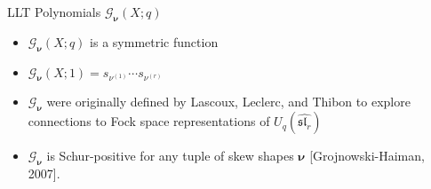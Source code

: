 \documentclass[dvipsnames]{beamer}
\newcommand{\Gcal}{{\mathcal G}}
\newcommand{\nubold}{{\boldsymbol \nu }}
\renewcommand{\sl}{\mathfrak{sl}}
\theoremstyle{definition}
\newcounter{c}
\begin{document}
\begin{frame}{LLT Polynomials \(\Gcal_\nubold(X;q)\)}
  \begin{itemize}
  \item \(\Gcal_\nubold(X;q)\) is a symmetric function\pause
  \item \(\Gcal_\nubold(X;1) = s_{\nu^{(1)}} \cdots s_{\nu^{(r)}}\)\pause
  \item \(\Gcal_\nubold\) were originally defined by Lascoux, Leclerc, and
    Thibon to explore connections to Fock space representations of \(U_q(\hat{\sl_r})\)\pause
  \item \(\Gcal_\nubold\) is Schur-positive for any tuple of skew shapes \(\nubold\)
    [Grojnowski-Haiman, 2007].
  \end{itemize}
\end{frame}
\end{document}
